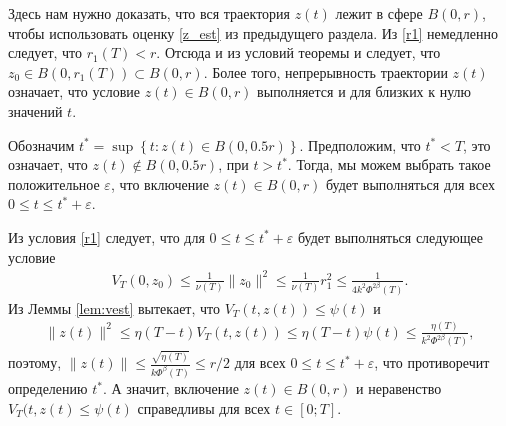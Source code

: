 \documentclass[../main.tex]{subfiles}
\begin{document}
Здесь нам нужно доказать, что вся траектория $z(t)$ лежит в сфере $B(0,r)$, чтобы использовать оценку \eqref{z_est} из предыдущего раздела. 
Из \eqref{r1} немедленно следует, что  $r_1(T) < r$.  Отсюда и из условий теоремы и  следует, что $z_0 \in B(0,r_1(T)) \subset B(0,r) $. 
Более того, непрерывность траектории  $z(t)$ означает, что условие $z(t) \in B(0,r) $ выполняется и для близких к нулю значений  $t$.  

Обозначим $t^* = \sup \left\{ t: z(t) \in B\left(0,0.5r\right)\right\} $.
Предположим, что $t^* < T$, это означает, что  $z(t) \notin B(0,0.5r)$, при $t > t^*$. Тогда, мы можем выбрать такое положительное  $ \varepsilon$, что включение $z(t) \in B(0,r)$ будет выполняться для всех $0 \leqslant t \leqslant t^* + \varepsilon$. 

Из условия \eqref{r1} следует, что для $0 \leqslant t \leqslant t^* + \varepsilon$ будет выполняться следующее условие
\begin{gather*}
    V_T(0,z_0) \leqslant \frac{1}{\nu(T)} \|z_0\|^2 \leqslant \frac{1}{\nu(T)} r_1^2 \leqslant \frac{1}{4k^2\Phi^{2\beta}(T)}.
\end{gather*}
Из Леммы \ref{lem:vest} вытекает, что  
$V_T(t, z(t))  \leqslant \psi(t) $ и
\begin{gather}\label{z_est}
    \|z(t)\|^2 \leqslant \eta(T-t) V_T(t,z(t)) \leqslant \eta(T-t) \psi(t) \leqslant  \frac{\eta(T)}{k^2\Phi^{2\beta}(T)},
\end{gather}
поэтому, $\|z(t)\| \leqslant \frac{\sqrt{\eta(T)}}{k\Phi^\beta(T)} \leqslant r/2$  для всех $0\leqslant t \leqslant t^*+\varepsilon$,
что противоречит определению $t^*$.  
А значит, включение $z(t) \in B(0,r) $  и неравенство  $V_T(t,z(t)\leqslant \psi(t)$ справедливы для всех $t \in [0; T]$.
        
\end{document}
